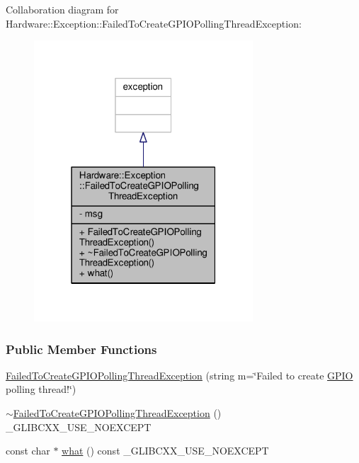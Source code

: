 Collaboration diagram for Hardware\+:\+:Exception\+:\+:Failed\+To\+Create\+G\+P\+I\+O\+Polling\+Thread\+Exception\+:
\nopagebreak
\begin{figure}[H]
\begin{center}
\leavevmode
\includegraphics[width=232pt]{class_hardware_1_1_exception_1_1_failed_to_create_g_p_i_o_polling_thread_exception__coll__graph}
\end{center}
\end{figure}
\subsubsection*{Public Member Functions}
\begin{DoxyCompactItemize}
\item 
\hyperlink{class_hardware_1_1_exception_1_1_failed_to_create_g_p_i_o_polling_thread_exception_a5505ab7e6613c84c9398bff4e2147510}{Failed\+To\+Create\+G\+P\+I\+O\+Polling\+Thread\+Exception} (string m=\char`\"{}Failed to create \hyperlink{class_hardware_1_1_g_p_i_o}{G\+P\+I\+O} polling thread!\char`\"{})
\item 
\hyperlink{class_hardware_1_1_exception_1_1_failed_to_create_g_p_i_o_polling_thread_exception_a078b506abc9790bee2c334709bf1bfe3}{$\sim$\+Failed\+To\+Create\+G\+P\+I\+O\+Polling\+Thread\+Exception} () \+\_\+\+G\+L\+I\+B\+C\+X\+X\+\_\+\+U\+S\+E\+\_\+\+N\+O\+E\+X\+C\+E\+P\+T
\item 
const char $\ast$ \hyperlink{class_hardware_1_1_exception_1_1_failed_to_create_g_p_i_o_polling_thread_exception_a27a85519693a4b569b324bfbf95e4bc6}{what} () const \+\_\+\+G\+L\+I\+B\+C\+X\+X\+\_\+\+U\+S\+E\+\_\+\+N\+O\+E\+X\+C\+E\+P\+T
\end{DoxyCompactItemize}
